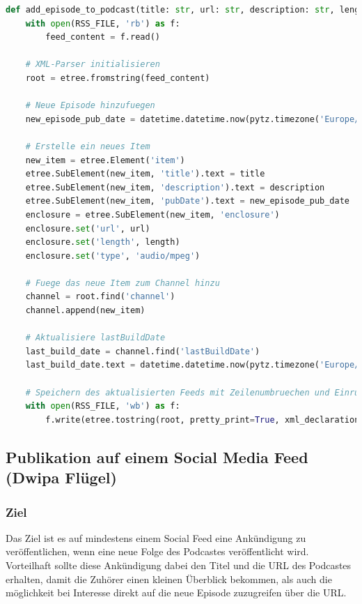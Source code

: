 \documentclass{article}
\begin{document}
\begin{lstlisting}[language=Python, caption=Vollständige Funktion des RSS-Feed Generators]
def add_episode_to_podcast(title: str, url: str, description: str, length: str):
    with open(RSS_FILE, 'rb') as f:
        feed_content = f.read()

    # XML-Parser initialisieren
    root = etree.fromstring(feed_content)

    # Neue Episode hinzufuegen
    new_episode_pub_date = datetime.datetime.now(pytz.timezone('Europe/Berlin')).strftime('%a, %d %b %Y %H:%M:%S %z')

    # Erstelle ein neues Item
    new_item = etree.Element('item')
    etree.SubElement(new_item, 'title').text = title
    etree.SubElement(new_item, 'description').text = description
    etree.SubElement(new_item, 'pubDate').text = new_episode_pub_date
    enclosure = etree.SubElement(new_item, 'enclosure')
    enclosure.set('url', url)
    enclosure.set('length', length)
    enclosure.set('type', 'audio/mpeg')

    # Fuege das neue Item zum Channel hinzu
    channel = root.find('channel')
    channel.append(new_item)

    # Aktualisiere lastBuildDate
    last_build_date = channel.find('lastBuildDate')
    last_build_date.text = datetime.datetime.now(pytz.timezone('Europe/Berlin')).strftime('%a, %d %b %Y %H:%M:%S %z')

    # Speichern des aktualisierten Feeds mit Zeilenumbruechen und Einrueckungen
    with open(RSS_FILE, 'wb') as f:
        f.write(etree.tostring(root, pretty_print=True, xml_declaration=True, encoding='UTF-8'))
\end{lstlisting}

\subsection{Publikation auf einem Social Media Feed \small{(Dwipa Flügel)}}

\subsubsection{Ziel}
Das Ziel ist es auf mindestens einem Social Feed eine Ankündigung zu veröffentlichen, wenn eine neue Folge des Podcastes veröffentlicht wird. Vorteilhaft sollte diese Ankündigung dabei den Titel und die URL des Podcastes erhalten, damit die Zuhörer einen kleinen Überblick bekommen, als auch die möglichkeit bei Interesse direkt auf die neue Episode zuzugreifen über die URL.
\end{document}
